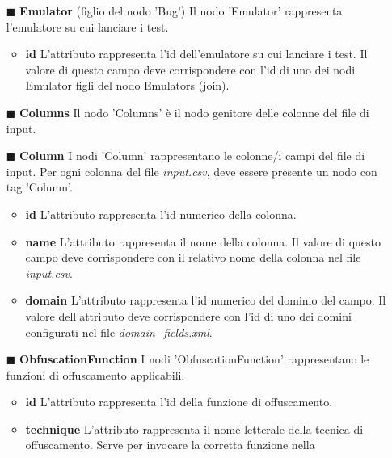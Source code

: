 \begin{itemize} [nosep]
\begin{itemize} [nosep]
			\item \textbf{description} L'attributo è opzionale e rappresenta la descrizione testuale del bug atteso.
		\end{itemize} 
			\item[$\blacksquare$] \textbf{Emulator} (figlio del nodo 'Bug')  \newline
		Il nodo 'Emulator' rappresenta l'emulatore su cui lanciare i test. 
			 \begin{itemize} [nosep]	
		\item \textbf{id} L'attributo rappresenta l'id dell'emulatore su cui lanciare i test.  Il valore di questo campo deve corrispondere con l'id di uno dei nodi Emulator figli del nodo Emulators (join).
			\end{itemize} 
			\item[$\blacksquare$] \textbf{Columns}  \newline
		Il nodo 'Columns' è il nodo genitore delle colonne del file di input. 
	\item[$\blacksquare$] \textbf{Column}  \newline
		I nodi 'Column' rappresentano le colonne/i campi del file di input. Per ogni colonna del file \emph{input.csv}, deve essere presente un nodo con tag 'Column'.
		 \begin{itemize} [nosep]	
		\item \textbf{id} L'attributo rappresenta l'id numerico della colonna. 
		\item  \textbf{name} L'attributo rappresenta il nome della colonna.  Il valore di questo campo deve corrispondere con il relativo nome della colonna nel file \emph{input.csv}.
		\item  \textbf{domain} L'attributo rappresenta l'id numerico del dominio del campo.  Il valore dell'attributo deve corrispondere con l'id di uno dei domini configurati nel file \emph{domain\_fields.xml}. 
			\end{itemize} 
			\item[$\blacksquare$] \textbf{ObfuscationFunction}  \newline
		I nodi 'ObfuscationFunction' rappresentano le funzioni di offuscamento applicabili.
		 \begin{itemize} [nosep]	
		\item \textbf{id} L'attributo rappresenta l'id della funzione di offuscamento. 
		 		\item \textbf{technique} L'attributo rappresenta il nome letterale della tecnica di offuscamento. Serve per invocare la corretta funzione nella

\end{itemize}
\end{itemize}
